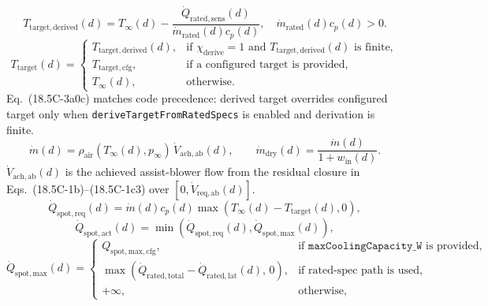 \documentclass[11pt]{article}
\begin{document}
\begin{equation}
T_{\mathrm{target,derived}}(d)=
T_\infty(d)-\frac{\dot Q_{\mathrm{rated,sens}}(d)}{\dot m_{\mathrm{rated}}(d)c_p(d)},
\quad \dot m_{\mathrm{rated}}(d)c_p(d)>0.
\tag{18.5C-3a0b}
\end{equation}
\begin{equation}
T_{\mathrm{target}}(d)=
\begin{cases}
T_{\mathrm{target,derived}}(d), & \text{if }\chi_{\mathrm{derive}}=1\text{ and }T_{\mathrm{target,derived}}(d)\text{ is finite},\\[4pt]
T_{\mathrm{target,cfg}}, & \text{if a configured target is provided},\\[4pt]
T_\infty(d), & \text{otherwise}.
\end{cases}
\tag{18.5C-3a0c}
\end{equation}
\noindent Eq.~(18.5C-3a0c) matches code precedence: derived target overrides configured target only when \texttt{deriveTargetFromRatedSpecs} is enabled and derivation is finite.
\begin{equation}
\dot m(d)=\rho_{\mathrm{air}}(T_\infty(d),p_\infty)\,\dot V_{\mathrm{ach},\mathrm{ab}}(d),
\qquad
\dot m_{\mathrm{dry}}(d)=\frac{\dot m(d)}{1+w_{\mathrm{in}}(d)}.
\tag{18.5C-3a0d}
\end{equation}
\noindent \(\dot V_{\mathrm{ach},\mathrm{ab}}(d)\) is the achieved assist-blower flow from the residual closure in Eqs.~(18.5C-1b)--(18.5C-1c3) over \([0,\dot V_{\mathrm{req},\mathrm{ab}}(d)]\).
\begin{equation}
\dot Q_{\mathrm{spot,req}}(d)=\dot m(d)c_p(d)\max\!\left(T_\infty(d)-T_{\mathrm{target}}(d),0\right),
\tag{18.5C-3a}
\end{equation}
\begin{equation}
\dot Q_{\mathrm{spot,act}}(d)=\min\!\left(\dot Q_{\mathrm{spot,req}}(d),\dot Q_{\mathrm{spot,max}}(d)\right),
\tag{18.5C-3b}
\end{equation}
\begin{equation}
\dot Q_{\mathrm{spot,max}}(d)=
\begin{cases}
Q_{\mathrm{spot,max,cfg}}, & \text{if }\texttt{maxCoolingCapacity\_W}\text{ is provided},\\[4pt]
\max\!\left(\dot Q_{\mathrm{rated,total}}-\dot Q_{\mathrm{rated,lat}}(d),\,0\right), & \text{if rated-spec path is used},\\[4pt]
+\infty, & \text{otherwise},
\end{cases}
\tag{18.5C-3b1}
\end{equation}
\end{document}

